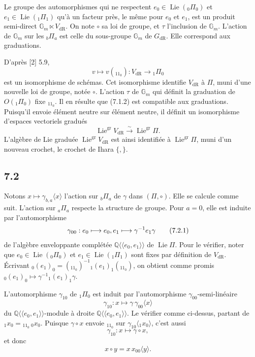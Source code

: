 \documentclass[10pt]{article}
\newcommand{\Q}{\mathbb Q}
\newcommand{\Gm}{\mathbb G_m}
\newcommand{\Lie}{\operatorname{Lie}}
\newcommand{\dR}{\mathrm{dR}}
\begin{document}
Le groupe des automorphismes qui ne respectent $e_0\in\Lie({}_0\Pi_0)$ et $e_1\in\Lie({}_1\Pi_1)$ qu'à un facteur près, le même pour $e_0$ et $e_1$, est un produit semi-direct $\Gm\ltimes V_{\dR}$. On note $\circ$ sa loi de groupe, et $\tau$ l'inclusion de $\Gm$. L'action de $\Gm$ sur les ${}_b\Pi_a$ est celle du sous-groupe $\Gm$ de $G_{\dR}$. Elle correspond aux graduations.

D'après [2] 5.9,
\begin{equation}
v\longmapsto v({}_11_0):V_{\dR}\longrightarrow {}_1\Pi_0
\tag{7.1.2}
\end{equation}
est un isomorphisme de schémas. Cet isomorphisme identifie $V_{\dR}$ à $\Pi$, muni d'une nouvelle loi de groupe, notée $\circ$. L'action $\tau$ de $\Gm$ qui définit la graduation de $O({}_1\Pi_0)$ fixe ${}_11_0$. Il en résulte que (7.1.2) est compatible aux graduations. Puisqu'il envoie élément neutre sur élément neutre, il définit un isomorphisme d'espaces vectoriels gradués
\begin{equation}
\Lie^{\mathrm{gr}}V_{\dR}\overset{\sim}{\longrightarrow}\Lie^{\mathrm{gr}}\Pi.
\tag{7.1.3}
\end{equation}
L'algèbre de Lie graduée $\Lie^{\mathrm{gr}}V_{\dR}$ est ainsi identifiée à $\Lie^{\mathrm{gr}}\Pi$, muni d'un nouveau crochet, le crochet de Ihara $\{,\}$.

\subsection*{7.2}
Notons $x\mapsto \gamma_{b,a}\langle x\rangle$ l'action sur ${}_b\Pi_a$ de $\gamma$ dans $(\Pi,\circ)$. Elle se calcule comme suit. L'action sur ${}_a\Pi_a$ respecte la structure de groupe. Pour $a=0$, elle est induite par l'automorphisme
\begin{equation}
\gamma_{00}: e_0\longmapsto e_0,\\ e_1\longmapsto \gamma^{-1}e_1\gamma
\tag{7.2.1}
\end{equation}
de l'algèbre enveloppante complétée $\Q\langle\!\langle e_0,e_1\rangle\!\rangle$ de $\Lie\Pi$. Pour le vérifier, noter que $e_0\in\Lie({}_0\Pi_0)$ et $e_1\in\Lie({}_1\Pi_1)$ sont fixes par définition de $V_{\dR}$. Écrivant ${}_0(e_1)_0=({}_11_0)^{-1}{}_1(e_1)_1({}_11_0)$, on obtient comme promis ${}_0(e_1)_0\mapsto \gamma^{-1}{}_1(e_1)_1\gamma$.

L'automorphisme $\gamma_{10}$ de ${}_1\Pi_0$ est induit par l'automorphisme $\gamma_{00}$-semi-linéaire
\begin{equation}
\gamma_{10}:x\longmapsto \gamma\,\gamma_{00}\langle x\rangle
\tag{7.2.2}
\end{equation}
du $\Q\langle\!\langle e_0,e_1\rangle\!\rangle$-module à droite $\Q\langle\!\langle e_0,e_1\rangle\!\rangle$. Le vérifier comme ci-dessus, partant de ${}_1x_0={}_11_0\,{}_0x_0$. Puisque $\gamma\circ x$ envoie ${}_11_0$ sur $\gamma_{10}\langle{}_1x_0\rangle$, c'est aussi
\[
\gamma_{10}:x\longmapsto \gamma\circ x,
\]
et donc
\begin{equation}
x\circ y=x\,x_{00}\langle y\rangle .
\tag{7.2.3}
\end{equation}
\end{document}
